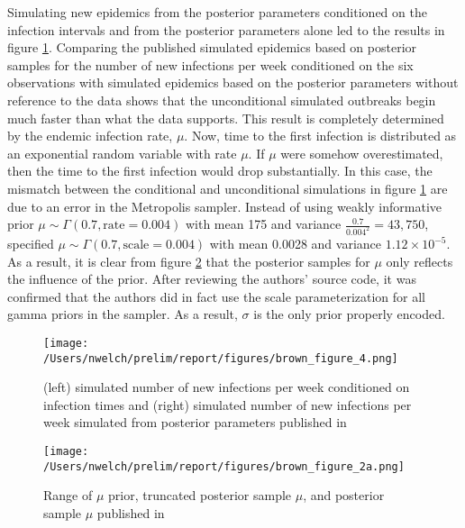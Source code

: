 \documentclass{uwstat572}
\begin{document}
Simulating new epidemics from the posterior parameters conditioned on the infection intervals and from the posterior parameters alone led \citet{Brown} to the results in figure \ref{fig:post_sim_plot}. 
Comparing the published simulated epidemics based on posterior samples for the number of new infections per week conditioned on the six observations with simulated epidemics based on the posterior parameters without reference to the data shows that the unconditional simulated outbreaks begin much faster than what the data supports. 
This result is completely determined by the endemic infection rate, $\mu$. 
Now, time to the first infection is distributed as an exponential random variable with rate $\mu$. 
If $\mu$ were somehow overestimated, then the time to the first infection would drop substantially.
In this case, the mismatch between the conditional and unconditional simulations in figure \ref{fig:post_sim_plot} are due to an error in the Metropolis sampler. 
Instead of using weakly informative prior $\mu \sim \Gamma(0.7, \text{rate}=0.004)$ with mean 175 and variance $\frac{0.7}{0.004^2}=43,750$, \citep{Brown} specified $\mu \sim \Gamma(0.7, \text{scale}=0.004)$ with mean 0.0028 and variance $1.12\times10^{-5}$. 
As a result, it is clear from figure \ref{fig:prior_mu_plot} that the posterior samples for $\mu$ only reflects the influence of the prior. 
After reviewing the authors' source code, it was confirmed that the authors did in fact use the scale parameterization for all gamma priors in the sampler. 
As a result, $\sigma$ is the only prior properly encoded. 

\begin{figure}[H]
\centering
\texttt{[image: /Users/nwelch/prelim/report/figures/brown\_figure\_4.png]}
\caption{(left) simulated number of new infections per week conditioned on infection times and (right) simulated number of new infections per week simulated from posterior parameters published in  \citet{Brown} }
\label{fig:post_sim_plot}
\end{figure} 

\begin{figure}[H]
\centering
\texttt{[image: /Users/nwelch/prelim/report/figures/brown\_figure\_2a.png]}
\caption{Range of $\mu$ prior, truncated posterior sample $\mu$, and posterior sample $\mu$ published in \citet{Brown}}
\label{fig:prior_mu_plot}
\end{figure} 
\end{document}
